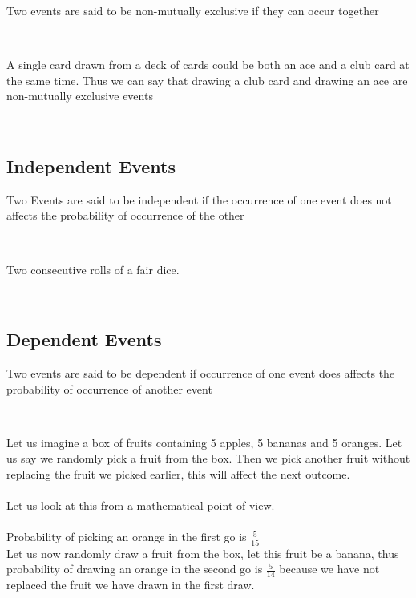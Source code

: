 \documentclass[twoside,12pt]{report}  %
\begin{document}
\begin{tcolorbox}[colback=red!5!white, colframe=red!75!black, title = \textbf{Non Mutually Exclusive Events}]
	Two events are said to be non-mutually exclusive if they can occur  together 
\end{tcolorbox}
\noindent
\\
\begin{tcolorbox}[colback=blue!5!white, colframe=blue!75!black, title = \textbf{Non-Mutually exclusive Event}]
	A single card drawn from a deck of cards could be both an ace and a club card at the same time. Thus we can say that drawing a club card and drawing an ace are non-mutually exclusive events
\end{tcolorbox}
\noindent
\\
\subsection{Independent Events}

\begin{tcolorbox}[colback=red!5!white, colframe=red!75!black, title = \textbf{Independent Events}]
	Two Events are said to be independent  if the occurrence of one event does not affects the probability of occurrence of the other  
\end{tcolorbox}
\noindent
\\
\begin{tcolorbox}[colback=blue!5!white, colframe=blue!75!black, title = \textbf{Independent Events}]
	Two consecutive rolls of a fair dice.
\end{tcolorbox}
\noindent
\\
\subsection{Dependent Events}

\begin{tcolorbox}[colback=red!5!white, colframe=red!75!black, title = \textbf{Dependent Events}]
	Two events are said to be dependent if occurrence of one event does affects the probability of occurrence of another event
\end{tcolorbox}
\noindent
\\
\begin{tcolorbox}[colback=blue!5!white, colframe=blue!75!black, title = \textbf{Dependent Events}]
	Let us imagine a box of fruits containing 5 apples, 5 bananas and 5 oranges. Let us say we randomly pick a fruit from the box. Then we pick another fruit without replacing the fruit we picked earlier, this will affect the next outcome.
	\\
	\\
	Let us look at this from a mathematical point of view.
	\\
	\\
	Probability of picking an orange in the first go is $ \frac{5}{15} $
	\\
	Let us now randomly draw a fruit from the box, let this fruit be a banana, thus probability of drawing an orange in the second go is $ \frac{5}{14} $ because we have not replaced the fruit we have drawn in the first draw.
\end{tcolorbox}
\noindent
\\
\end{document}
